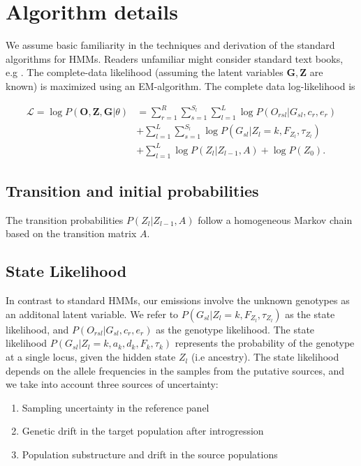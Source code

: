 \documentclass[10pt,a4paper]{article}
\newcommand{\BFZ}{\mathbf{Z}}
\newcommand{\BFG}{\mathbf{G}}
\newcommand{\BFO}{\mathbf{O}}
\begin{document}
\section*{Algorithm details}
We assume basic familiarity in the techniques and derivation of the standard algorithms for HMMs. Readers unfamiliar  might consider standard text books, e.g \citep{durbin1998}. The complete-data likelihood (assuming the latent variables $\BFG, \BFZ$ are known) is maximized using an EM-algorithm. The complete data log-likelihood is

\begin{align}
\mathcal{L}  = \log P(\BFO, \BFZ, \BFG | \theta) &= \sum_{r=1}^R\sum_{s=1}^{S_l}\sum_{l=1}^L \log P(O_{rsl} | G_{sl}, c_r, e_r)\nonumber\\
&+ \sum_{l=1}^L \sum_{s=1}^{S_l} \log P(G_{sl} | Z_l = k, F_{Z_l}, \tau_{Z_l})\nonumber\\
&+ \sum_{l=1}^L  \log P(Z_l |Z_{l-1}, A) +\log P(Z_0) 
\label{eq:ll:correct}.
\end{align}


\subsection*{Transition and initial probabilities}
The transition probabilities $P(Z_l|Z_{l-1}, A)$ follow a homogeneous Markov chain based on  the transition matrix $A$. 
\subsection*{State Likelihood}
In contrast to standard HMMs, our emissions involve the unknown genotypes as an additonal latent variable. We refer to $P(G_{sl} | Z_l = k, F_{Z_l}, \tau_{Z_l})$ as the state likelihood, and $P(O_{rsl} | G_{sl}, c_r, e_r)$ as the genotype likelihood. 
 The state likelihood $P(G_{sl}|Z_l=k, a_k, d_k, F_k, \tau_k)$ represents the probability of the genotype at a single locus, given the hidden state $Z_l$ (i.e ancestry). The state likelihood depends on the allele frequencies in the samples from the putative sources, and we take into account three sources of uncertainty:
 
 \begin{enumerate}
 	\item Sampling uncertainty in the reference panel
 	\item Genetic drift in the target population after introgression 	
 	\item Population substructure and drift in the source populations
 \end{enumerate}
 
\end{document}
